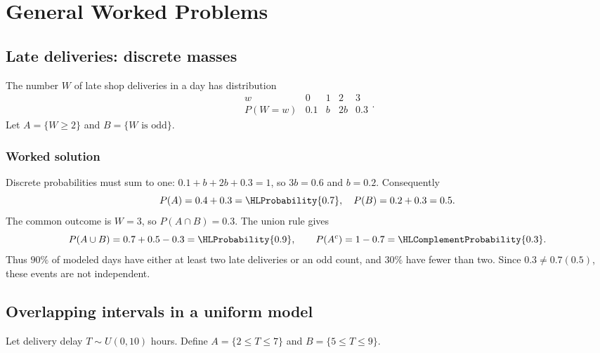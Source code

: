 \section{General Worked Problems}\label{sec:general-worked}

\subsection{Late deliveries: discrete masses}\label{prob:sec:general-worked0}
The number $W$ of late shop deliveries in a day has distribution
\[
\begin{array}{c|rrrr}w&0&1&2&3\\ \hline P(W=w)&0.1&b&2b&0.3\end{array}.
\]
Let $A=\{W\ge2\}$ and $B=\{W\text{ is odd}\}$.
\subsubsection*{Worked solution}\label{sol:sec:general-worked0}
Discrete probabilities must sum to one: $0.1+b+2b+0.3=1$, so $3b=0.6$ and $b=0.2$. Consequently
\[
P(A)=0.4+0.3=\HLProbability{0.7},\quad P(B)=0.2+0.3=0.5.
\]
The common outcome is $W=3$, so $P(A\cap B)=0.3$. The union rule gives
\[
P(A\cup B)=0.7+0.5-0.3=\HLProbability{0.9},\qquad
P(A^c)=1-0.7=\HLComplementProbability{0.3}.
\]
Thus $90\%$ of modeled days have either at least two late deliveries or an odd count, and $30\%$ have fewer than two. Since $0.3\ne0.7(0.5)$, these events are not independent.


\subsection{Overlapping intervals in a uniform model}\label{prob:sec:general-worked1}
Let delivery delay $T\sim U(0,10)$ hours. Define $A=\{2\le T\le7\}$ and $B=\{5\le T\le9\}$.
